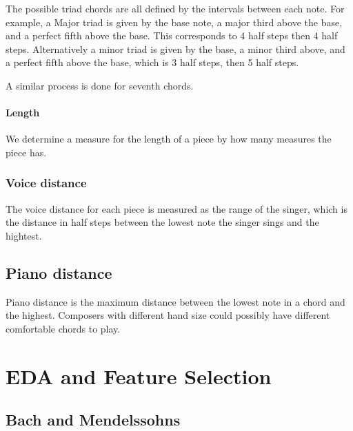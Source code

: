 \documentclass[12pt,twoside]{reedthesis}
\theoremstyle{definition}
\theoremstyle{definition}
\theoremstyle{definition}
\theoremstyle{remark}
\begin{document}
The possible triad chords are all defined by the intervals between each
note. For example, a Major triad is given by the base note, a major
third above the base, and a perfect fifth above the base. This
corresponds to 4 half steps then 4 half steps. Alternatively a minor
triad is given by the base, a minor third above, and a perfect fifth
above the base, which is 3 half steps, then 5 half steps.

A similar process is done for seventh chords.

\subsubsection{Length}\label{length}

We determine a measure for the length of a piece by how many measures
the piece has.

\subsection{Voice distance}\label{voice-distance}

The voice distance for each piece is measured as the range of the
singer, which is the distance in half steps between the lowest note the
singer sings and the hightest.

\section{Piano distance}\label{piano-distance}

Piano distance is the maximum distance between the lowest note in a
chord and the highest. Composers with different hand size could possibly
have different comfortable chords to play.

\chapter{EDA and Feature Selection}\label{eda-and-feature-selection}

\section{Bach and Mendelssohns}\label{bach-and-mendelssohns}
\end{document}
